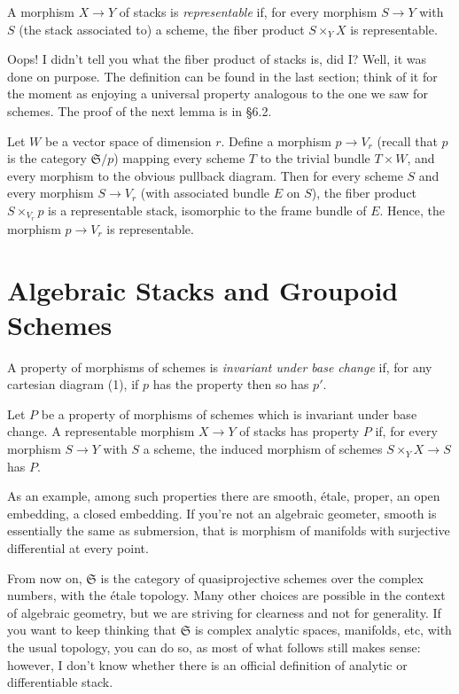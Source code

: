 \documentclass[12pt]{memoir}
\begin{document}
\begin{Def}\label{def:4.5}
A morphism $X \to Y$ of stacks is \emph{representable} if, for every morphism $S \to Y$ with $S$ (the stack associated to) a scheme, the fiber product $S \times_Y X$ is representable.
\end{Def}

Oops! I didn't tell you what the fiber product of stacks is, did I? Well, it was done on purpose. The definition can be found in the last section; think of it for the moment as enjoying a universal property analogous to the one we saw for schemes. The proof of the next lemma is in \S 6.2.

\begin{Lem}\label{lem:4.6}
Let $W$ be a vector space of dimension $r$. Define a morphism $p \to V_r$ (recall that $p$ is the category $\mathfrak{S}/p$) mapping every scheme $T$ to the trivial bundle $T \times W$, and every morphism to the obvious pullback diagram. Then for every scheme $S$ and every morphism $S \to V_r$ (with associated bundle $E$ on $S$), the fiber product $S \times_{V_r} p$ is a representable stack, isomorphic to the frame bundle of $E$. Hence, the morphism $p \to V_r$ is representable.
\end{Lem}

\section{Algebraic Stacks and Groupoid Schemes}

A property of morphisms of schemes is \emph{invariant under base change} if, for any cartesian diagram (1), if $p$ has the property then so has $p'$.

\begin{Def}\label{def:5.1}
Let $P$ be a property of morphisms of schemes which is invariant under base change. A representable morphism $X \to Y$ of stacks has property $P$ if, for every morphism $S \to Y$ with $S$ a scheme, the induced morphism of schemes $S \times_Y X \to S$ has $P$.
\end{Def}


As an example, among such properties there are smooth, \'etale, proper, an open embedding, a closed embedding. If you're not an algebraic geometer, smooth is essentially the same as submersion, that is morphism of manifolds with surjective differential at every point.

From now on, $\mathfrak{S}$ is the category of quasiprojective schemes over the complex numbers, with the \'etale topology. Many other choices are possible in the context of algebraic geometry, but we are striving for clearness and not for generality. If you want to keep thinking that $\mathfrak{S}$ is complex analytic spaces, manifolds, etc, with the usual topology, you can do so, as most of what follows still makes sense: however, I don't know whether there is an official definition of analytic or differentiable stack.
\end{document}
